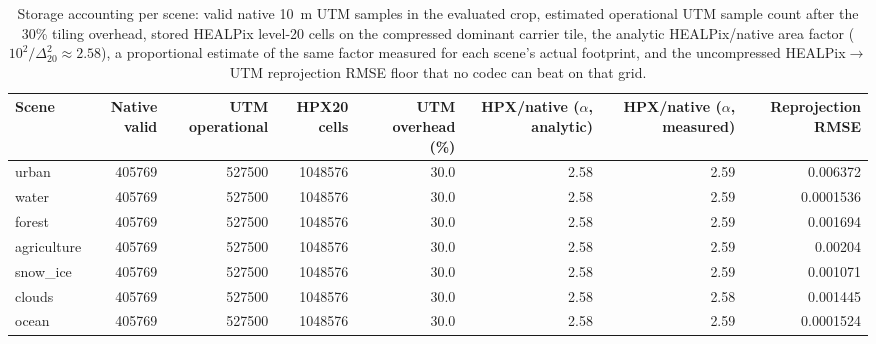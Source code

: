 \begin{table}[t]
\centering
\caption{Storage accounting per scene: valid native \SI{10}{m} UTM samples in the evaluated crop, estimated operational UTM sample count after the 30\% tiling overhead, stored HEALPix level-20 cells on the compressed dominant carrier tile, the analytic HEALPix/native area factor ($10^2/\Delta_{20}^2 \approx 2.58$), a proportional estimate of the same factor measured for each scene's actual footprint, and the uncompressed HEALPix$\to$UTM reprojection RMSE floor that no codec can beat on that grid.}
\label{tab:storage_accounting}
\begin{tabular}{@{}lrrrrrrr@{}}
\toprule
Scene & Native valid & UTM operational & HPX20 cells & UTM overhead (\%) & HPX/native ($\alpha$, analytic) & HPX/native ($\alpha$, measured) & Reprojection RMSE \\
\midrule
urban & 405769 & 527500 & 1048576 & 30.0 & 2.58 & 2.59 & 0.006372 \\
water & 405769 & 527500 & 1048576 & 30.0 & 2.58 & 2.59 & 0.0001536 \\
forest & 405769 & 527500 & 1048576 & 30.0 & 2.58 & 2.59 & 0.001694 \\
agriculture & 405769 & 527500 & 1048576 & 30.0 & 2.58 & 2.59 & 0.00204 \\
snow_ice & 405769 & 527500 & 1048576 & 30.0 & 2.58 & 2.59 & 0.001071 \\
clouds & 405769 & 527500 & 1048576 & 30.0 & 2.58 & 2.58 & 0.001445 \\
ocean & 405769 & 527500 & 1048576 & 30.0 & 2.58 & 2.59 & 0.0001524 \\
\bottomrule
\end{tabular}
\end{table}
